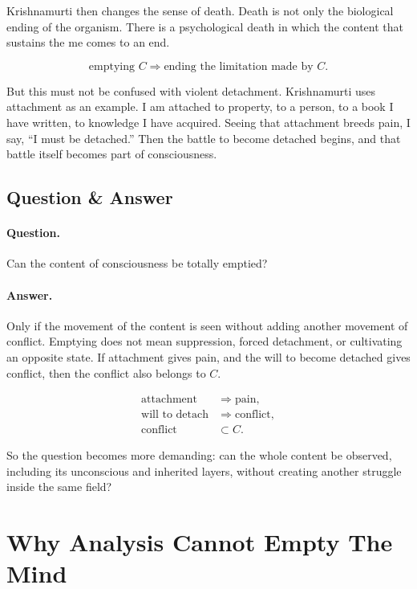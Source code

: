 Krishnamurti then changes the sense of death. Death is not only the biological ending of the organism. There is a psychological death in which the content that sustains the me comes to an end.

\begin{equation}
\text{emptying } C
\Rightarrow
\text{ending the limitation made by } C.
\end{equation}

But this must not be confused with violent detachment. Krishnamurti uses attachment as an example. I am attached to property, to a person, to a book I have written, to knowledge I have acquired. Seeing that attachment breeds pain, I say, ``I must be detached.'' Then the battle to become detached begins, and that battle itself becomes part of consciousness.

\subsection{Question \& Answer}

\paragraph{Question.}
Can the content of consciousness be totally emptied?

\paragraph{Answer.}
Only if the movement of the content is seen without adding another movement of conflict. Emptying does not mean suppression, forced detachment, or cultivating an opposite state. If attachment gives pain, and the will to become detached gives conflict, then the conflict also belongs to \(C\).

\begin{align}
\text{attachment} &\Rightarrow \text{pain}, \\
\text{will to detach} &\Rightarrow \text{conflict}, \\
\text{conflict} &\subset C.
\end{align}

So the question becomes more demanding: can the whole content be observed, including its unconscious and inherited layers, without creating another struggle inside the same field?

\section{Why Analysis Cannot Empty The Mind}

